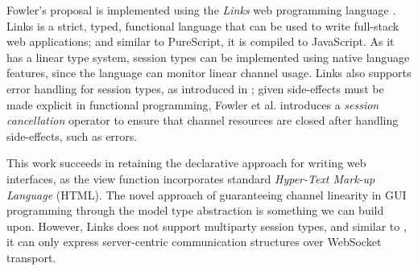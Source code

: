 Fowler's proposal \cite{MVU2020} is implemented using
the \textit{Links} web programming language
\cite{LINKS}. Links is a strict, typed, functional language
that can be used to write full-stack web applications;
and similar to PureScript, it is compiled to JavaScript.
As it has a linear type system, session types can be
implemented using native language features, since the
language can monitor linear channel usage.
Links also supports error handling for session types,
as introduced in \cite{Exceptional}; 
given side-effects must be made explicit
in functional programming,
Fowler et al. \cite{Exceptional} introduces
a \textit{session cancellation} operator to ensure
that channel resources are closed after handling
side-effects, such as errors.

This work succeeds in 
retaining the declarative approach for writing
web interfaces, as the view function incorporates standard
\textit{Hyper-Text Mark-up Language} (HTML).
The novel approach of guaranteeing channel linearity
in GUI programming through the model type abstraction
is something we can build upon. 
However, Links does not support multiparty session types,
and similar to \cite{PureScript2019},
it can only express server-centric communication structures
over WebSocket transport.